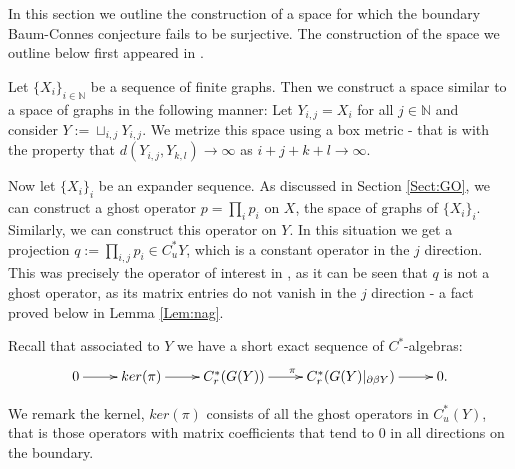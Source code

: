 \documentclass[11pt]{amsart}
\theoremstyle{plain}
\theoremstyle{definition}%
\theoremstyle{remark}%
\begin{document}
In this section we outline the construction of a space for which the boundary Baum-Connes conjecture fails to be surjective. The construction of the space we outline below first appeared in \cite{MR2363697}.

Let $\lbrace X_{i} \rbrace_{i \in \mathbb{N}}$ be a sequence of finite graphs. Then we construct a space similar to a space of graphs in the following manner: Let $Y_{i,j} = X_{i}$ for all $j \in \mathbb{N}$ and consider $Y:= \sqcup_{i,j} Y_{i,j}$. We metrize this space using a box metric - that is with the property that $d(Y_{i,j},Y_{k,l}) \rightarrow \infty$ as $i+j+k+l \rightarrow \infty$. 

Now let $\lbrace X_{i} \rbrace_{i}$ be an expander sequence. As discussed in Section \ref{Sect:GO}, we can construct a ghost operator $p= \prod_{i} p_{i}$ on $X$, the space of graphs of $\lbrace X_{i} \rbrace_{i}$. Similarly, we can construct this operator on $Y$. In this situation we get a projection $q:=\prod_{i,j}p_{i} \in C^{*}_{u}Y$, which is a constant operator in the $j$ direction. This was precisely the operator of interest in \cite{MR2363697}, as it can be seen that $q$ is not a ghost operator, as its matrix entries do not vanish in the $j$ direction - a fact proved below in Lemma \ref{Lem:nag}.

Recall that associated to $Y$ we have a short exact sequence of $C^{*}$-algebras:
\begin{equation*}
\xymatrix{
0 \ar[r] & ker(\pi) \ar[r]& C_{r}^{*}(G(Y)) \ar[r]^{\pi} & C_{r}^{*}(G(Y)|_{\partial\beta Y}) \ar[r] & 0.
}
\end{equation*}

We remark the kernel, $ker(\pi)$ consists of all the ghost operators in $C^{*}_{u}(Y)$, that is those operators with matrix coefficients that tend to $0$ in all directions on the boundary. 
\end{document}
